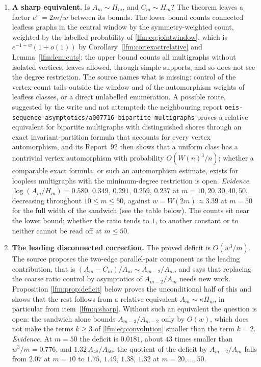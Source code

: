 \documentclass[11pt,letterpaper]{article}
\theoremstyle{remark}\newtheorem{remark}[theorem]{Remark}
\begin{document}
\begin{enumerate}
\item\label{lfm:q:sharp} \textbf{A sharp equivalent.} Is $A_m\sim H_m$, and
$C_m\sim H_m$? The theorem leaves a factor $e^w=2m/w$ between its bounds.
The lower bound counts connected leafless graphs in the central window by
the symmetry-weighted count, weighted by the labelled probability of
\eqref{lfm:eq:jointwindow}, which is $e^{-1-w}(1+o(1))$ by
Corollary~\ref{lfm:cor:exactrelative} and Lemma~\ref{lfm:lem:cuts}; the upper bound counts all
multigraphs without isolated vertices, leaves allowed, through simple
supports, and so does not see the degree restriction. The source names what
is missing: control of the vertex-count tails outside the window and of the
automorphism weights of leafless classes, or a direct unlabelled
enumeration. A possible route, suggested by the write and not attempted:
the neighbouring report
\nolinkurl{oeis-sequence-asymptotics/a007716-bipartite-multigraphs} proves a
relative equivalent for bipartite multigraphs with distinguished shores
through an exact invariant-partition formula that accounts for every vertex
automorphism, and its Report~92 then shows that a uniform class has a
nontrivial vertex automorphism with probability $O(W(n)^3/n)$; whether a
comparable exact formula, or such an automorphism estimate, exists for
loopless multigraphs with the minimum-degree restriction is open.
\emph{Evidence.} $\log(A_m/H_m)=0.580$, $0.349$, $0.291$, $0.259$, $0.237$ at
$m=10,20,30,40,50$, decreasing throughout $10\le m\le50$, against
$w=W(2m)\approx3.39$ at $m=50$ for the full width of the sandwich (see the
table below). The counts sit near the lower bound; whether the ratio tends
to $1$, to another constant or to neither cannot be read off at $m\le50$.

\item\label{lfm:q:deficit} \textbf{The leading disconnected correction.} The
proved deficit is $O(w^3/m)$. The source proposes the two-edge parallel-pair
component as the leading contribution, that is
$(A_m-C_m)/A_m\sim A_{m-2}/A_m$, and says that replacing the coarse ratio
control by asymptotics of $A_{m-2}/A_m$ needs new work. Proposition
\ref{lfm:prop:deficit} below proves the unconditional half of this and shows
that the rest follows from a relative equivalent $A_m\sim\kappa H_m$, in
particular from item~\ref{lfm:q:sharp}. Without such an equivalent the
question is open: the sandwich alone bounds $A_{m-3}/A_{m-2}$ only by
$O(w)$, which does not make the terms $k\ge3$ of \eqref{lfm:eq:convolution}
smaller than the term $k=2$. \emph{Evidence.} At $m=50$ the deficit is
$0.0181$, about $43$ times smaller than $w^3/m=0.776$, and
$1.32\,A_{48}/A_{50}$; the quotient of the deficit by $A_{m-2}/A_m$ falls
from $2.07$ at $m=10$ to $1.75$, $1.49$, $1.38$, $1.32$ at $m=20,\dots,50$.


\end{enumerate}
\end{document}
